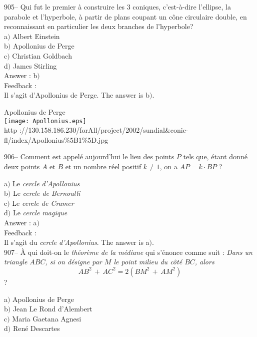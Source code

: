 \documentclass[letterpaper, 12pt]{article}
\begin{document}
905-- Qui fut le premier \`a construire les 3 coniques,
c'est-\`a-dire l'ellipse, la parabole et l'hyperbole, \`a partir
de plans coupant un c\^one circulaire double, en reconnaissant en
particulier les deux branches de l'hyperbole?\\

a$)$ Albert Einstein \\
b$)$ Apollonius de Perge \\
c$)$ Christian Goldbach \\
d$)$ James Stirling  \\

Answer : b$)$\\

Feedback : \\
Il s'agit d'Apollonius de Perge. The answer is b$)$.\\

        \begin{center}
        Apollonius de Perge\\
    \texttt{[image: Apollonius.eps]}\\
        {\footnotesize http
://130.158.186.230/forAll/project/2002/sundial\&conic-fl/index/Apollonius\%5B1\%5D.jpg}
    \end{center}

906-- Comment est appel\'e aujourd'hui le lieu des points $P$ tels que,
\'etant donn\'e deux points $A$ et $B$
et un nombre r\'eel positif $k\not=1$, on a $AP=k\cdot BP$ ?

a$)$ Le {\sl cercle d'Apollonius} \\
b$)$ Le {\sl cercle de Bernoulli} \\
c$)$ Le {\sl cercle de Cramer} \\
d$)$ Le {\sl cercle magique}  \\

Answer : a$)$\\

Feedback : \\
Il s'agit du {\sl cercle d'Apollonius}. The answer is a$)$.\\

907-- \`A qui doit-on le {\sl th\'eor\`eme de la m\'ediane} qui
s'\'enonce comme suit : {\sl \og Dans un triangle $ABC$, si on
d\'esigne par $M$ le point milieu du c\^ot\'e $BC$, alors
$$AB^2\,+\,AC^2=2(BM^2\,+\,AM^2)$$}\fg ?

a$)$ Apollonius de Perge \\
b$)$ Jean Le Rond d'Alembert \\
c$)$ Maria Gaetana Agnesi \\
d$)$ Ren\'e Descartes \\
\end{document}
